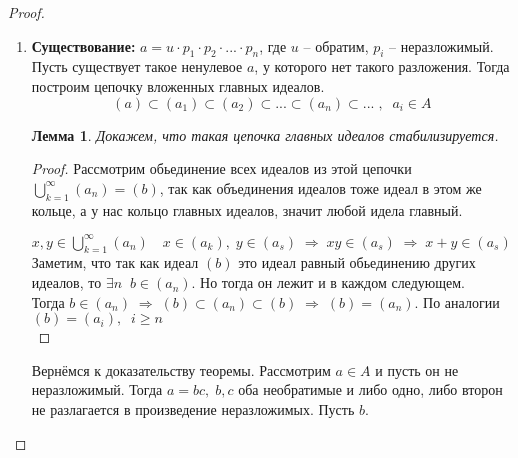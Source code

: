 \documentclass[12pt, a4paper]{article}
\newcommand{\ra}{\;\Rightarrow\;}
\newcommand{\bo}{\geqslant}
\theoremstyle{plain}
\newtheorem*{Lemma*}{Лемма}
\theoremstyle{definition}
\begin{document}
\begin{proof}~\\
    \begin{enumerate}
        \item \textbf{Существование:} $ a = u\cdot p_1\cdot p_2\cdot...\cdot p_n$, где $u$ -- обратим, $p_i$ -- неразложимый.\\
              Пусть существует такое ненулевое $a$, у которого нет такого разложения. Тогда построим цепочку вложенных главных идеалов.
              \[(a)\subset(a_1)\subset(a_2)\subset...\subset(a_n)\subset...\;,\;\; a_i\in A\]
        \begin{Lemma*}
            Докажем, что такая цепочка главных идеалов стабилизируется.
        \end{Lemma*}
        \begin{proof}
            Рассмотрим обьединение всех идеалов из этой цепочки\\ $\bigcup\limits_{k=1}^{\infty}(a_n) = (b)$, так как объединения идеалов тоже идеал в этом же кольце, а у нас кольцо главных идеалов, значит любой идела главный.

            $x,y\in \bigcup\limits_{k=1}^{\infty}(a_n) \quad x\in (a_k),\; y\in (a_s)\ra xy\in(a_s)\ra x+y\in(a_s)$\\
            Заметим, что так как идеал $(b)$ это идеал равный обьединению других идеалов, то $\exists n\;\; b\in(a_n)$. Но тогда он лежит и в каждом следующем.
            \\ Тогда $b\in (a_n)\ra (b)\subset(a_n)\subset(b)\ra (b)=(a_n)$. По аналогии $(b) = (a_i),\;\; i\bo n$\\
        \end{proof}
        Вернёмся к доказательству теоремы. Рассмотрим $a\in A$ и пусть он не неразложимый. Тогда $a = bc,\; b,c$ оба необратимые и либо одно, либо второн не разлагается в произведение неразложимых. Пусть $b$.


\end{enumerate}
\end{proof}
\end{document}
